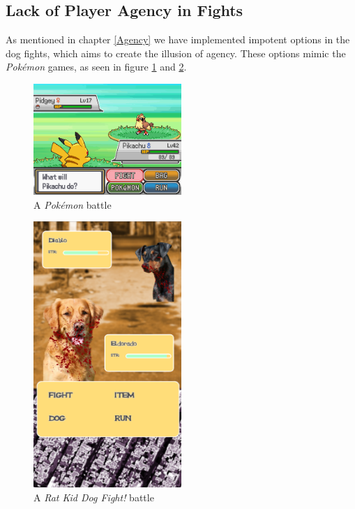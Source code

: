 \subsection{Lack of Player Agency in Fights}
As mentioned in chapter \ref{Agency} we have implemented impotent options in the dog fights, which aims to create the illusion of agency. These options mimic the \textit{Pok\'emon} games, as seen in figure \ref{fig:PokeBattle} and \ref{fig:DogFightBattle}. \

\begin{figure}[h!] 
	\centering
    \includegraphics[width=0.5\textwidth]{PokemonBattle.png}
    \caption{A \textit{Pok\'emon} battle}
    \label{fig:PokeBattle}
\end{figure}

\begin{figure}[h!]
	\centering
    \includegraphics[width=0.5\textwidth]{battle.png}
    \caption{A \textit{Rat Kid Dog Fight!} battle}
    \label{fig:DogFightBattle}
\end{figure}

